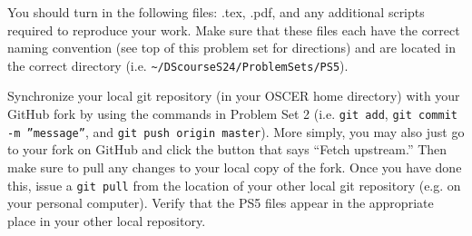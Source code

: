 \documentclass[12pt,english]{exam}
\begin{document}
\begin{questions}
\question You should turn in the following files: .tex, .pdf,  and any additional scripts required to reproduce your work.  Make sure that these files each have the correct naming convention (see top of this problem set for directions) and are located in the correct directory (i.e. \texttt{\textasciitilde/DScourseS24/ProblemSets/PS5}).

\question Synchronize your local git repository (in your OSCER home directory) with your GitHub fork by using the commands in Problem Set 2 (i.e. \texttt{git add}, \texttt{git commit -m ''message''}, and \texttt{git push origin master}). More simply, you may also just go to your fork on GitHub and click the button that says ``Fetch upstream.'' Then make sure to pull any changes to your local copy of the fork. Once you have done this, issue a \texttt{git pull} from the location of your other local git repository (e.g. on your personal computer). Verify that the PS5 files appear in the appropriate place in your other local repository.

\end{questions}
\end{document}
